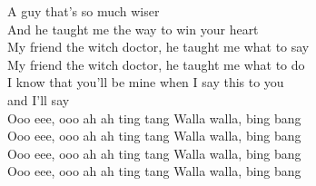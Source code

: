 A  guy that's so much wiser\\
 And he taught me the way to win your  heart\\
 My friend the witch doctor, he taught me what to say\\
 My friend the witch doctor, he taught me what to do\\
 I know that you'll be mine when  I say this to you\\
 and I'll say\\
 Ooo eee,  ooo ah ah  ting tang  Walla walla, bing bang\\
 Ooo eee,  ooo ah ah ting  tang Walla walla, bing  bang\\
 Ooo eee,  ooo ah ah  ting tang  Walla walla, bing bang\\
 Ooo eee,  ooo ah ah ting  tang Walla walla, bing  bang
